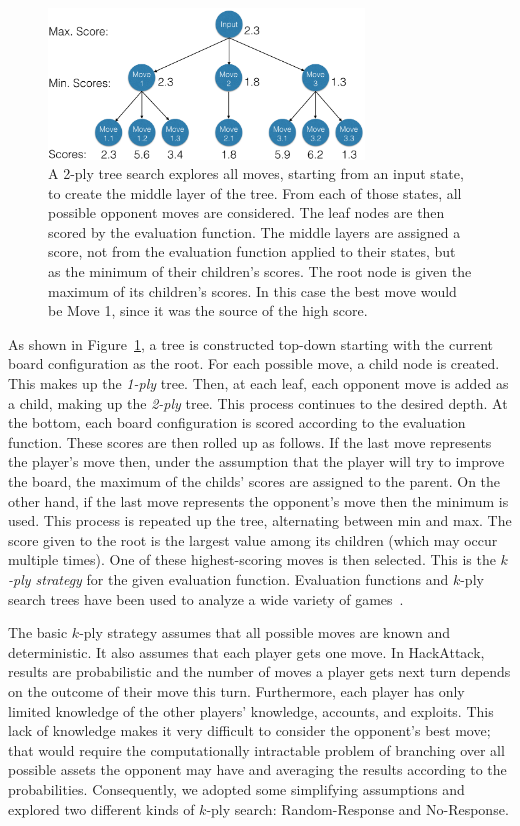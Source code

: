 \documentclass{sig-alternate}
\begin{document}
\begin{figure}[h!tbp]
\includegraphics[width=3.3in]{tree-pic2.png}
\caption{A 2-ply tree search explores all moves, starting from an input state, to create the middle layer of the tree. From each of those states, all possible opponent moves are considered. The leaf nodes are then scored by the evaluation function. The middle layers are assigned a score, not from the evaluation function applied to their states, but as the minimum of their children's scores. The root node is given the maximum of its children's scores. In this case the best move would be Move 1, since it was the source of the high score.\label{fig:minmaxtree}}
\end{figure}

As shown in Figure~\ref{fig:minmaxtree}, a tree is constructed top-down starting with the current board configuration as the root. For each possible move, a child node is created. This makes up the {\em 1-ply} tree. Then, at each leaf, each opponent move is added as a child, making up the {\em 2-ply} tree. This process continues to the desired depth. At the bottom, each board configuration is scored according to the evaluation function. These scores are then rolled up as follows. If the last move represents the player's move then, under the assumption that the player will try to improve the board, the maximum of the childs' scores are assigned to the parent. On the other hand, if the last move represents the opponent's move then the minimum is used. This process is repeated up the tree, alternating between min and max. The score given to the root is the largest value among its children (which may occur multiple times). One of these highest-scoring moves is then selected. This is the {\em $k$-ply strategy} for the given evaluation function. Evaluation functions and $k$-ply search trees have been used to analyze a wide variety of games~\cite{levy2009computer}. 

The basic $k$-ply strategy assumes that all possible moves are known and deterministic. It also assumes that each player gets one move. In HackAttack, results are probabilistic and the number of moves a player gets next turn depends on the outcome of their move this turn. Furthermore, each player has only limited knowledge of the other players' knowledge, accounts, and exploits. This lack of knowledge makes it very difficult to consider the opponent's best move; that would require the computationally intractable problem of branching over all possible assets the opponent may have and averaging the results according to the probabilities. Consequently, we adopted some simplifying assumptions and explored two different kinds of $k$-ply search: Random-Response and No-Response.
\end{document}
